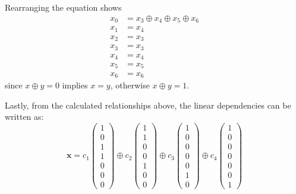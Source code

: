 \documentclass[11pt,a4paper]{article}
\begin{document}
Rearranging the equation shows
\[
\begin{aligned}
x_0 &= x_3 \oplus x_4 \oplus x_5 \oplus x_6 \\
x_1 &= x_4 \\
x_2 &= x_3 \\
x_3 &= x_3 \\
x_4 &= x_4 \\
x_5 &= x_5 \\
x_6 &= x_6
\end{aligned}
\]
since $x \oplus y = 0$ implies $x = y$, otherwise $x \oplus y = 1$.

Lastly, from the calculated relationships above, the linear dependencies can be written as:
\[
\mathbf{x} = 
c_1 \begin{pmatrix} 1 \\ 0 \\ 1 \\ 1 \\ 0 \\ 0 \\ 0 \end{pmatrix} \oplus
c_2 \begin{pmatrix} 1 \\ 1 \\ 0 \\ 0 \\ 1 \\ 0 \\ 0 \end{pmatrix} \oplus
c_3 \begin{pmatrix} 1 \\ 0 \\ 0 \\ 0 \\ 0 \\ 1 \\ 0 \end{pmatrix} \oplus
c_4 \begin{pmatrix} 1 \\ 0 \\ 0 \\ 0 \\ 0 \\ 0 \\ 1 \end{pmatrix}
\]
\end{document}
